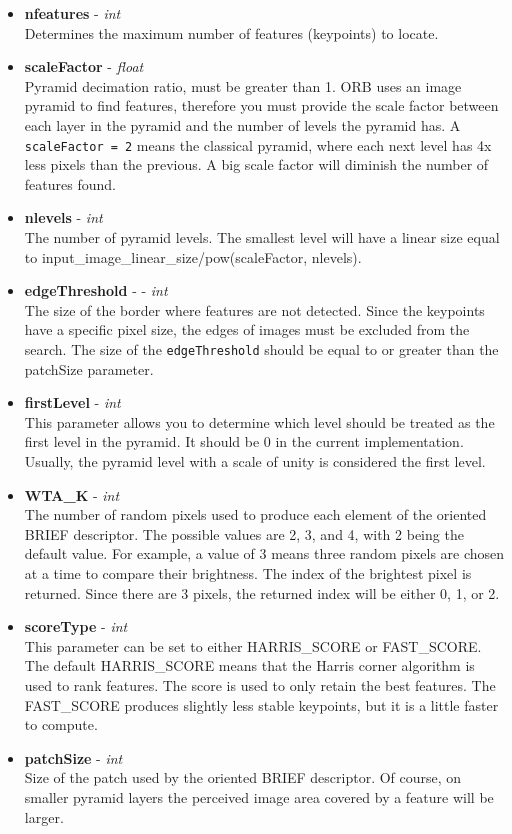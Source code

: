 \documentclass[11pt]{article}
\begin{document}
\begin{itemize}
\item
  \textbf{nfeatures} - \emph{int}\\
  Determines the maximum number of features (keypoints) to locate.
\item
  \textbf{scaleFactor} - \emph{float}\\
  Pyramid decimation ratio, must be greater than 1. ORB uses an image
  pyramid to find features, therefore you must provide the scale factor
  between each layer in the pyramid and the number of levels the pyramid
  has. A \texttt{scaleFactor\ =\ 2} means the classical pyramid, where
  each next level has 4x less pixels than the previous. A big scale
  factor will diminish the number of features found.
\item
  \textbf{nlevels} - \emph{int}\\
  The number of pyramid levels. The smallest level will have a linear
  size equal to input\_image\_linear\_size/pow(scaleFactor, nlevels).
\item
  \textbf{edgeThreshold} - - \emph{int}\\
  The size of the border where features are not detected. Since the
  keypoints have a specific pixel size, the edges of images must be
  excluded from the search. The size of the \texttt{edgeThreshold}
  should be equal to or greater than the patchSize parameter.
\item
  \textbf{firstLevel} - \emph{int}\\
  This parameter allows you to determine which level should be treated
  as the first level in the pyramid. It should be 0 in the current
  implementation. Usually, the pyramid level with a scale of unity is
  considered the first level.
\item
  \textbf{WTA\_K} - \emph{int}\\
  The number of random pixels used to produce each element of the
  oriented BRIEF descriptor. The possible values are 2, 3, and 4, with 2
  being the default value. For example, a value of 3 means three random
  pixels are chosen at a time to compare their brightness. The index of
  the brightest pixel is returned. Since there are 3 pixels, the
  returned index will be either 0, 1, or 2.
\item
  \textbf{scoreType} - \emph{int}\\
  This parameter can be set to either HARRIS\_SCORE or FAST\_SCORE. The
  default HARRIS\_SCORE means that the Harris corner algorithm is used
  to rank features. The score is used to only retain the best features.
  The FAST\_SCORE produces slightly less stable keypoints, but it is a
  little faster to compute.
\item
  \textbf{patchSize} - \emph{int}\\
  Size of the patch used by the oriented BRIEF descriptor. Of course, on
  smaller pyramid layers the perceived image area covered by a feature
  will be larger.
\end{itemize}
\end{document}
